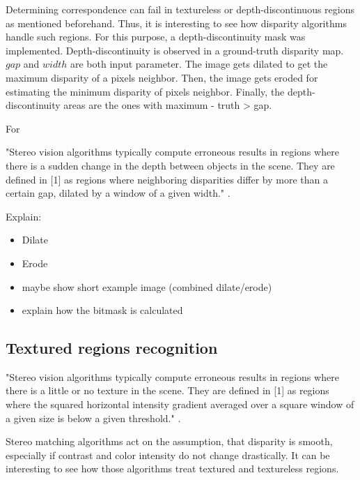 Determining correspondence can fail in textureless or depth-discontinuous regions as mentioned beforehand.
Thus, it is interesting to see how disparity algorithms handle such regions.
For this purpose, a depth-discontinuity mask was implemented.
\newline\newline\noindent Depth-discontinuity is observed in a ground-truth disparity map. $gap$ and $width$ are both input parameter.
\newline\newline\noindent The image gets dilated to get the maximum disparity of a pixels neighbor.
Then, the image gets eroded for estimating the minimum disparity of pixels neighbor.
Finally, the depth-discontinuity areas are the ones with maximum - truth > gap.


For 


"Stereo vision algorithms typically compute erroneous results in regions where there is a sudden change in the depth between objects in the scene. They are defined in [1] as regions where neighboring disparities differ by more than a certain gap, dilated by a window of a given width."
\citep{scharstein2002taxonomy, cyganek2011introduction}.

Explain:

\begin{itemize}
  \item Dilate
  \item Erode
  \item maybe show short example image (combined dilate/erode)
  \item explain how the bitmask is calculated
\end{itemize}

\subsection*{Textured regions recognition}

"Stereo vision algorithms typically compute erroneous results in regions where there is a little or no texture in the scene. They are defined in [1] as regions where the squared horizontal intensity gradient averaged over a square window of a given size is below a given threshold."
\citep{scharstein2002taxonomy, cyganek2011introduction}.

Stereo matching algorithms act on the assumption, that disparity is smooth, especially if contrast and color intensity do not change drastically.
It can be interesting to see how those algorithms treat textured and textureless regions.

